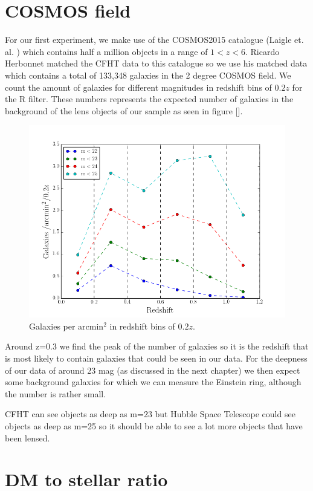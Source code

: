 \section{COSMOS field}

For our first experiment, we make use of the COSMOS2015 catalogue (Laigle et. al. \citeyear{Reference21}) which contains half a million objects in a range of $1<z<6$. Ricardo Herbonnet matched the CFHT data to this catalogue so we use his matched data which contains a total of 133,348 galaxies in the 2 degree COSMOS field. We count the amount of galaxies for different magnitudes in redshift bins of $0.2z$ for the R filter. These numbers represents the expected number of galaxies in the background of the lens objects of our sample as seen in figure []. 

\begin{figure}[H]
\centering
\includegraphics[width=12cm]{images/galaxies_per_arcmin.png}
\caption[Galaxies per arcmin]{Galaxies per arcmin$^2$ in redshift bins of $0.2z$. }
\end{figure}

Around z=0.3 we find the peak of the number of galaxies so it is the redshift that is most likely to contain galaxies that could be seen in our data. For the deepness of our data of around 23 mag (as discussed in the next chapter) we then expect some background galaxies for which we can measure the Einstein ring, although the number is rather small. 

CFHT can see objects as deep as m=23 but Hubble Space Telescope could see objects as deep as m=25 so it should be able to see a lot more objects that have been lensed.

\section{DM to stellar ratio}

